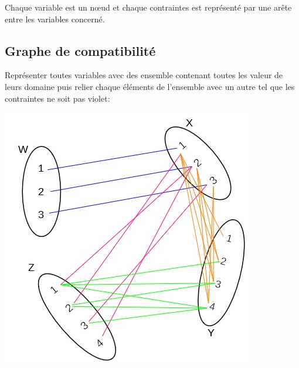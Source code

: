 Chaque variable est un nœud et chaque contraintes est représenté par une arête entre les variables concerné.\\
\begin{center}
\end{center}
\subsection{Graphe de compatibilité}

Représenter toutes variables avec des ensemble contenant toutes les valeur de leurs domaine puis relier chaque éléments de l'ensemble avec un autre tel que les contraintes ne soit pas violet:\\
\begin{center}
\includegraphics[scale=0.6]{img/aic_csp_1.jpg} 
\end{center}
\pagebreak


